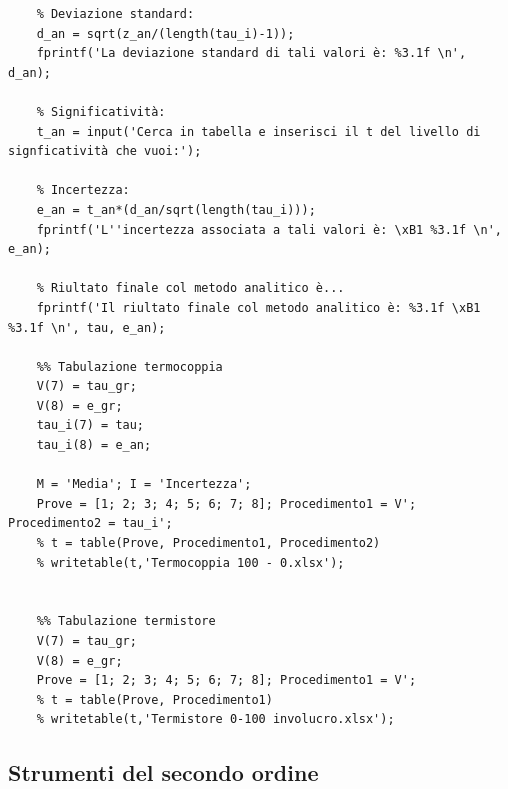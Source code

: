 \documentclass[a4paper, 12pt, twoside]{report}
\begin{document}
\begin{verbatim}
	% Deviazione standard:
	d_an = sqrt(z_an/(length(tau_i)-1));
	fprintf('La deviazione standard di tali valori è: %3.1f \n', d_an);
	
	% Significatività:
	t_an = input('Cerca in tabella e inserisci il t del livello di signficatività che vuoi:');
	
	% Incertezza:
	e_an = t_an*(d_an/sqrt(length(tau_i)));
	fprintf('L''incertezza associata a tali valori è: \xB1 %3.1f \n', e_an);
	
	% Riultato finale col metodo analitico è...
	fprintf('Il riultato finale col metodo analitico è: %3.1f \xB1 %3.1f \n', tau, e_an);
	
	%% Tabulazione termocoppia
	V(7) = tau_gr;
	V(8) = e_gr;
	tau_i(7) = tau;
	tau_i(8) = e_an;
	
	M = 'Media'; I = 'Incertezza'; 
	Prove = [1; 2; 3; 4; 5; 6; 7; 8]; Procedimento1 = V'; Procedimento2 = tau_i';
	% t = table(Prove, Procedimento1, Procedimento2) 
	% writetable(t,'Termocoppia 100 - 0.xlsx');
	
	
	%% Tabulazione termistore 
	V(7) = tau_gr;
	V(8) = e_gr;
	Prove = [1; 2; 3; 4; 5; 6; 7; 8]; Procedimento1 = V';
	% t = table(Prove, Procedimento1) 
	% writetable(t,'Termistore 0-100 involucro.xlsx');	
\end{verbatim}
			
\subsection{Strumenti del secondo ordine}
\end{document}
